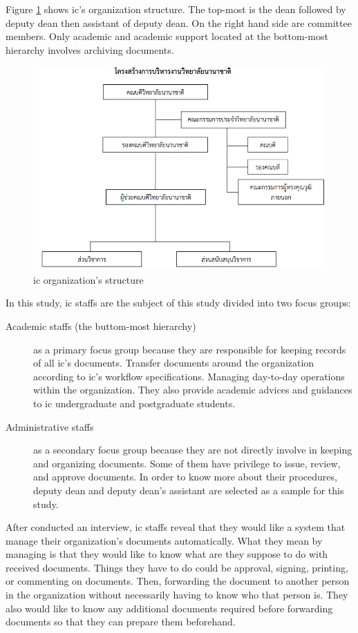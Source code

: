 Figure \ref{ic-org-sturcture} shows \gls{ic}'s organization structure.
The top-most is the dean followed by deputy dean then assistant of deputy dean.
On the right hand side are committee members.
Only academic and academic support located at the bottom-most hierarchy involves archiving documents.
 \begin{figure}[h]
 	\centering
 	\caption{\gls{ic} organization's structure}
 	\label{ic-org-sturcture}
 	\includegraphics[scale=0.7]{res/Methodology/ic-org}
 \end{figure}

In this study, \gls{ic} staffs are the subject of this study divided into two focus groups:
\begin{description}
	\item [Academic staffs (the buttom-most hierarchy)] as a primary focus group because they are responsible for keeping records of all \gls{ic}'s documents.
	Transfer documents around the organization according to \gls{ic}'s workflow specifications.
	Managing day-to-day operations within the organization.
	They also provide academic advices and guidances to \gls{ic} undergraduate and postgraduate students.

	\item [Administrative staffs] as a secondary focus group because they are not directly involve in keeping and organizing documents.
	Some of them have privilege to issue, review, and approve documents.
	In order to know more about their procedures, deputy dean and deputy dean's assistant are selected as a sample for this study.
\end{description}

After conducted an interview, \gls{ic} staffs reveal that they would like a system that manage their organization's documents automatically.
What they mean by managing is that they would like to know what are they suppose to do with received documents.
Things they have to do could be approval, signing, printing, or commenting on documents.
Then, forwarding the document to another person in the organization without necessarily having to know who that person is.
They also would like to know any additional documents required before forwarding documents so that they can prepare them beforehand.

